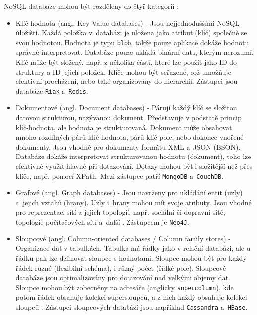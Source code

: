\vspace{0.5cm}
\noindent NoSQL databáze mohou být rozděleny do čtyř kategorií \cite{noSqlOverview}:
\begin{itemize}
    \item Klíč-hodnota (angl. Key-Value databases) - Jsou nejjednoduššími NoSQL úložišti. Každá položka v~databázi je uložena jako atribut (klíč) společně se svou hodnotou. Hodnota je typu \texttt{blob}, takže pouze aplikace dokáže hodnotu správně interpretovat. Databáze pouze ukládá binární data, kterým nerozumí. Klíč může být složený, např. z několika částí, které lze použít jako ID do struktury a ID jejich položek. Klíče mohou být seřazené, což umožňuje efektivní procházení, nebo také organizovány do hierarchií. Zástupci jsou databáze \texttt{Riak} a~\texttt{Redis}.
    
    \item Dokumentové (angl. Document databases) - Párují každý klíč se složitou datovou strukturou, nazývanou dokument. Představuje v podstatě princip klíč-hodnota, ale hodnota je strukturovaná. Dokument může obsahovat mnoho rozdílných párů klíč-hodnota, párů klíč-pole, nebo dokonce vnořené dokumenty. Jsou vhodné pro dokumenty formátu XML a~JSON (BSON).
    Databáze dokáže interpretovat strukturovanou hodnotu (dokument), toho lze efektivně využít hlavně při dotazování. Dotazy mohou být i složitější než přes klíče, např. pomocí XPath. Mezi zástupce patří \texttt{MongoDB} a~\texttt{CouchDB}.
    
    \item Grafové (angl. Graph databases) - Jsou navrženy pro ukládání entit (uzly) a~jejich vztahů (hrany). Uzly i~hrany mohou mít svoje atributy. Jsou vhodné pro reprezentaci sítí a jejich topologií, např. sociální či dopravní sítě, topologie počítačových sítí a~další \cite{noSqlPdb}.
    Zástupcem je \texttt{Neo4J}.
    
    \item Sloupcové (angl. Column-oriented databases / Column family stores) - Organizace dat v tabulkách. Tabulka má řádky jako v relační databázi, ale u řádku pak lze definovat sloupce s hodnotami. Sloupce mohou být pro každý řádek různé (flexibilní schéma), i různý počet (řídké pole). Sloupcové databáze jsou optimalizovány pro dotazování nad velkými objemy dat. Sloupce mohou být zobecněny na adresáře (anglicky \texttt{supercolumn}), kde potom řádek obsahuje kolekci supersloupců, a z nich každý obsahuje kolekci sloupců \cite{noSqlPdb}. Zástupci sloupcových databází jsou například \texttt{Cassandra} a~\texttt{HBase}.
\end{itemize}

